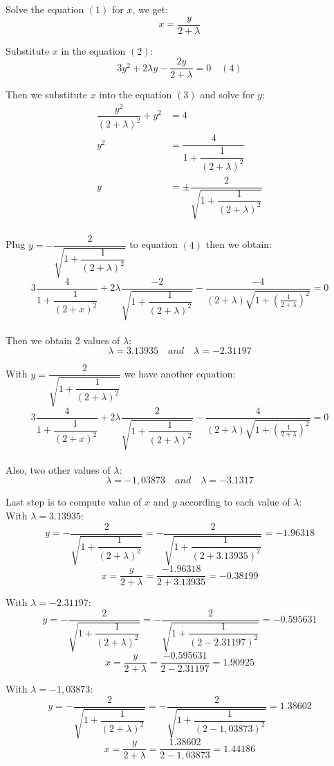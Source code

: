 Solve the equation $(1)$ for $x$, we get:
$$ x = \dfrac{y}{2 + \lambda} $$

Substitute $x$ in the equation $(2)$:
$$ 3y^2 + 2 \lambda y - \dfrac{2y}{2 + \lambda} = 0 \quad (4)$$

Then we substitute $x$ into the equation $(3)$ and solve for $y$:
\begin{align*}
  \dfrac{y^2}{(2 + \lambda)^2} + y^2 &= 4 \\
  y^2 &= \dfrac{4}{1 + \dfrac{1}{(2 + \lambda)^2}} \\
  y &= \pm \dfrac{2}{  \sqrt{1 + \dfrac{1}{(2+ \lambda)^2}}  } \\
\end{align*}

Plug $y = -\dfrac{2}{  \sqrt{1 + \dfrac{1}{(2+ \lambda)^2}}  }$ to equation $(4)$ then we obtain:
$$ 3 \dfrac{4}{1 + \dfrac{1}{(2+x)^2}} + 2 \lambda \dfrac{-2}{ \sqrt{1 + \dfrac{1}{(2 + \lambda)^2}} } - \dfrac{-4}{(2 + \lambda) \sqrt{1 + \left(\frac{1}{2 + \lambda}\right)^2} } = 0 $$\\[6pt]

Then we obtain 2 values of $\lambda$:
$$ \lambda = 3.13935 \quad and \quad \lambda = -2.31197 $$

With $y = \dfrac{2}{  \sqrt{1 + \dfrac{1}{(2+ \lambda)^2}}  }$ we have another equation:
$$ 3 \dfrac{4}{1 + \dfrac{1}{(2+x)^2}} + 2 \lambda \dfrac{2}{ \sqrt{1 + \dfrac{1}{(2 + \lambda)^2}} } - \dfrac{4}{(2 + \lambda) \sqrt{1 + \left(\frac{1}{2 + \lambda}\right)^2} } = 0 $$\\[6pt]

Also, two other values of $\lambda$:
$$ \lambda = -1,03873 \quad and \quad \lambda = -3.1317 $$

Last step is to compute value of $x$ and $y$ according to each value of $\lambda$: \\
With $\lambda = 3.13935$:
$$ y = -\dfrac{2}{ \sqrt{1 + \dfrac{1}{(2 + \lambda)^2}} } = -\dfrac{2}{ \sqrt{1 + \dfrac{1}{(2 + 3.13935)^2}} } = -1.96318$$
$$ x = \dfrac{y}{2 + \lambda} = \dfrac{-1.96318}{2 + 3.13935} = -0.38199 $$

With $\lambda = -2.31197$: 
$$ y = -\dfrac{2}{ \sqrt{1 + \dfrac{1}{(2 + \lambda)^2}} } = -\dfrac{2}{ \sqrt{1 + \dfrac{1}{(2 -2.31197)^2}} } = -0.595631$$
$$ x = \dfrac{y}{2 + \lambda} = \dfrac{-0.595631}{2 -2.31197} = 1.90925 $$

With $\lambda = -1,03873$: 
$$ y = -\dfrac{2}{ \sqrt{1 + \dfrac{1}{(2 + \lambda)^2}} } = -\dfrac{2}{ \sqrt{1 + \dfrac{1}{(2 -1,03873)^2}} } =1.38602$$
$$ x = \dfrac{y}{2 + \lambda} = \dfrac{1.38602}{2 -1,03873} = 1.44186 $$

